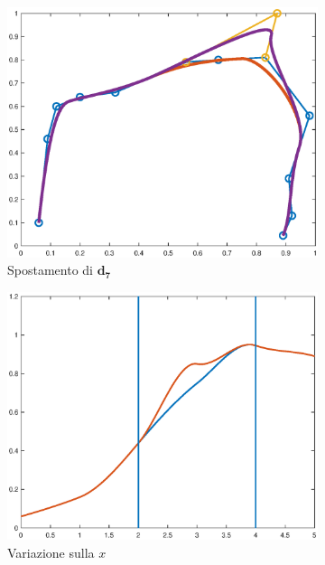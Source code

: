 \documentclass[a4paper, 10pt]{article}
\begin{document}
\begin{figure}[]
  \centering
  \begin{subfigure}[b]{0.3\textwidth}
    \includegraphics[width=\textwidth]{figure/loc3.eps}
    \caption{Spostamento di $\mathbf{d_7}$ }
    \label{fig:loc3}
  \end{subfigure}
  \begin{subfigure}[b]{0.3\textwidth}
      \includegraphics[width=\textwidth]{figure/loc2.eps}
      \caption{Variazione sulla $x$}
      \label{fig:loc2}
  \end{subfigure}
  \begin{subfigure}[b]{0.3\textwidth}

\end{subfigure}
\end{figure}
\end{document}
